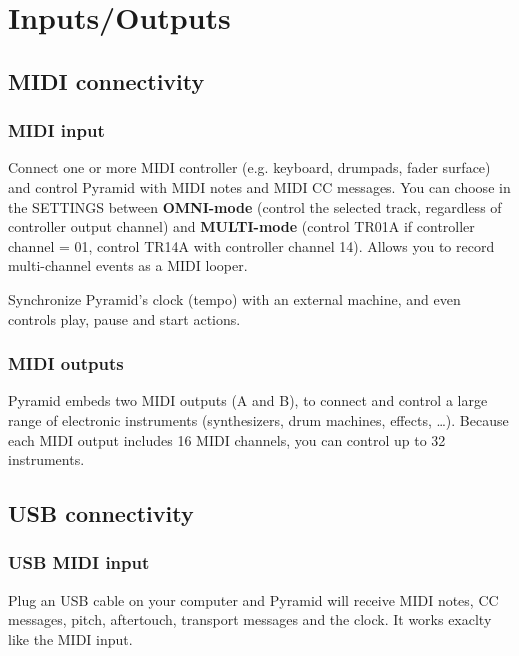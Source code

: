 \chapter{Inputs/Outputs}

\section{MIDI connectivity}

\subsection{MIDI input}


Connect one or more MIDI controller (e.g. keyboard, drumpads, fader surface) and control Pyramid with MIDI notes and MIDI CC messages. You can choose in the SETTINGS between \textbf{OMNI-mode} (control the selected track, regardless of controller output channel) and \textbf{MULTI-mode} (control TR01A if controller channel = 01, control TR14A with controller channel 14). Allows you to record multi-channel events as a MIDI looper.

Synchronize Pyramid's clock (tempo) with an external machine, and even controls play, pause and start actions.

\subsection{MIDI outputs}


Pyramid embeds two MIDI outputs (A and B), to connect and control a large range of electronic instruments (synthesizers, drum machines, effects, \ldots). Because each MIDI output includes 16 MIDI channels, you can control up to 32 instruments.


\section{USB connectivity}

\subsection{USB MIDI input}


Plug an USB cable on your computer and Pyramid will receive MIDI notes, CC messages, pitch, aftertouch, transport messages and the clock. It works exaclty like the MIDI input.

